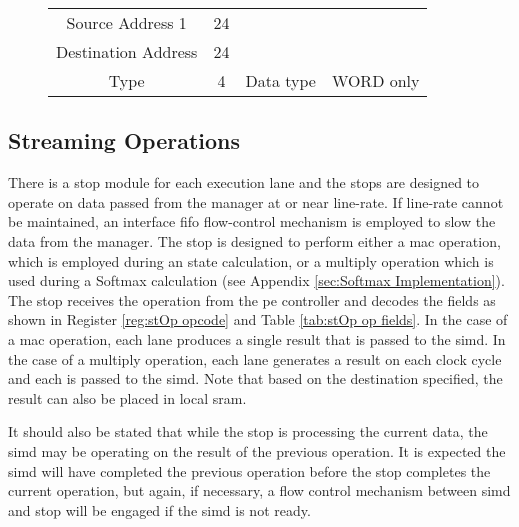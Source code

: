 \begin{figure}[h]
\begin{minipage}{1\textwidth}
\begin{minipage}{1\textwidth}
\begin{minipage}[t]{0.75\textwidth}
\begin{adjustbox}{width=1\textwidth}
\begin{tabular}{ |c|c|c|c|  }
              Source Address 1    & 24 &                                       &                                        \\\cline{1-2}
              Destination Address & 24 &                                       &                                        \\\cline{1-4}
              Type                & 4  & Data type                             & WORD only                              \\\cline{1-4}
              \hline
            \end{tabular}
        \end{adjustbox}
      \end{minipage}
    \end{minipage}
    \label{tab:stOp pointer memory}
  \end{minipage}
\end{figure}


\subsection{Streaming Operations}
\label{sec:stOps}

There is a \ac{stop} module for each execution lane and the \acp{stop} are designed to operate on data passed from the manager at or near line-rate. 
If line-rate cannot be maintained, an interface \ac{fifo} flow-control mechanism is employed to slow the data from the manager.
The \ac{stop} is designed to perform either a \ac{mac} operation, which is employed during \ac{an} state calculation, or a multiply operation which is used during a Softmax \cite{wikipedia_softmax} calculation (see Appendix \ref{sec:Softmax Implementation}).
The \ac{stop} receives the operation from the \ac{pe} controller and decodes the fields as shown in Register \ref{reg:stOp opcode} and Table \ref{tab:stOp op fields}.
In the case of a \ac{mac} operation, each lane produces a single result that is passed to the \ac{simd}.
In the case of a multiply operation, each lane generates a result on each clock cycle and each is passed to the \ac{simd}.
Note that based on the destination specified, the result can also be placed in local \ac{sram}.

It should also be stated that while the \ac{stop} is processing the current data, the \ac{simd} may be operating on the result of the previous operation. 
It is expected the \ac{simd} will have completed the previous operation before the \ac{stop} completes the current operation, but again, if necessary, a flow control mechanism between \ac{simd} and \ac{stop} will be engaged if the \ac{simd} is not ready.

